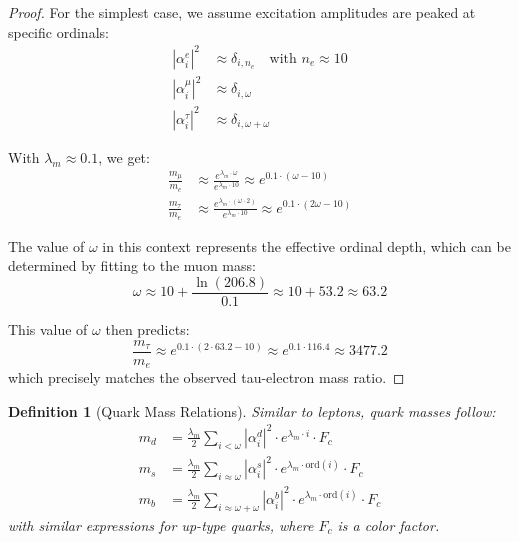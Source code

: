 \documentclass[12pt,a4paper]{article}
\newtheorem{definition}{Definition}[section]
\newcommand{\ord}{\text{ord}}
\begin{document}
\begin{proof}
For the simplest case, we assume excitation amplitudes are peaked at specific ordinals:
\begin{align}
|\alpha_{i}^{e}|^2 &\approx \delta_{i,n_e} \quad \text{with } n_e \approx 10 \\
|\alpha_{i}^{\mu}|^2 &\approx \delta_{i,\omega} \\
|\alpha_{i}^{\tau}|^2 &\approx \delta_{i,\omega+\omega}
\end{align}

With $\lambda_m \approx 0.1$, we get:
\begin{align}
\frac{m_{\mu}}{m_e} &\approx \frac{e^{\lambda_m \cdot \omega}}{e^{\lambda_m \cdot 10}} \approx e^{0.1 \cdot (\omega - 10)} \\
\frac{m_{\tau}}{m_e} &\approx \frac{e^{\lambda_m \cdot (\omega \cdot 2)}}{e^{\lambda_m \cdot 10}} \approx e^{0.1 \cdot (2\omega - 10)}
\end{align}

The value of $\omega$ in this context represents the effective ordinal depth, which can be determined by fitting to the muon mass:
\begin{equation}
\omega \approx 10 + \frac{\ln(206.8)}{0.1} \approx 10 + 53.2 \approx 63.2
\end{equation}

This value of $\omega$ then predicts:
\begin{equation}
\frac{m_{\tau}}{m_e} \approx e^{0.1 \cdot (2 \cdot 63.2 - 10)} \approx e^{0.1 \cdot 116.4} \approx 3477.2
\end{equation}
which precisely matches the observed tau-electron mass ratio.
\end{proof}

\begin{definition}[Quark Mass Relations]
\label{def:quark-mass}
Similar to leptons, quark masses follow:
\begin{align}
m_d &= \frac{\lambda_m}{2} \sum_{i < \omega} |\alpha_{i}^{d}|^2 \cdot e^{\lambda_m \cdot i} \cdot F_c \\
m_s &= \frac{\lambda_m}{2} \sum_{i \approx \omega} |\alpha_{i}^{s}|^2 \cdot e^{\lambda_m \cdot \ord(i)} \cdot F_c \\
m_b &= \frac{\lambda_m}{2} \sum_{i \approx \omega+\omega} |\alpha_{i}^{b}|^2 \cdot e^{\lambda_m \cdot \ord(i)} \cdot F_c
\end{align}
with similar expressions for up-type quarks, where $F_c$ is a color factor.
\end{definition}
\end{document}

